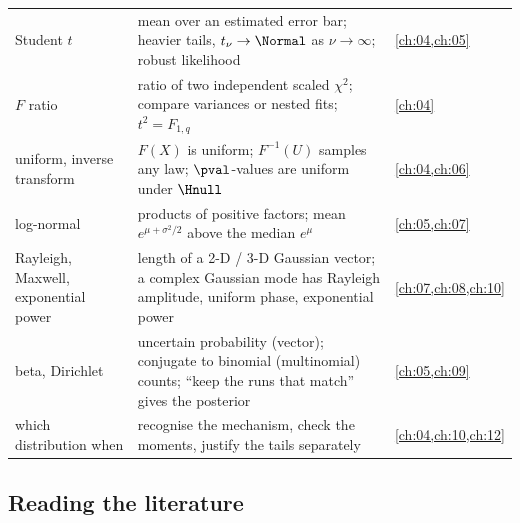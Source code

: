 \begin{center}
\begin{tabularx}{\linewidth}{@{}>{\raggedright\arraybackslash}p{3.3cm}
                               >{\raggedright\arraybackslash}X
                               >{\raggedright\arraybackslash}p{2.7cm}@{}}
Student $t$ & mean over an estimated error bar; heavier tails, $t_\nu\to\Normal$ as $\nu\to\infty$; robust likelihood & \cref{ch:04,ch:05}\\
$F$ ratio & ratio of two independent scaled $\chi^2$; compare variances or nested fits; $t^2=F_{1,q}$ & \cref{ch:04}\\
uniform, inverse transform & $F(X)$ is uniform; $F^{-1}(U)$ samples any law; $\pval$-values are uniform under $\Hnull$ & \cref{ch:04,ch:06}\\
log-normal & products of positive factors; mean $e^{\mu+\sigma^2/2}$ above the median $e^\mu$ & \cref{ch:05,ch:07}\\
Rayleigh, Maxwell, exponential power & length of a 2-D / 3-D Gaussian vector; a complex Gaussian mode has Rayleigh amplitude, uniform phase, exponential power & \cref{ch:07,ch:08,ch:10}\\
beta, Dirichlet & uncertain probability (vector); conjugate to binomial (multinomial) counts; ``keep the runs that match'' gives the posterior & \cref{ch:05,ch:09}\\
which distribution when & recognise the mechanism, check the moments, justify the tails separately & \cref{ch:04,ch:10,ch:12}\\
\bottomrule
\end{tabularx}
\end{center}

\subsection*{Reading the literature}

